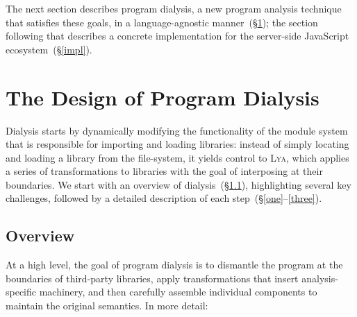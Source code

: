\documentclass[letterpaper,twocolumn,10pt]{article}
\newcommand{\sx}[1]{(\S\ref{#1})}
\newcommand{\sys}{{\scshape Lya}\xspace}
\begin{document}
The next section describes program dialysis, a new program analysis technique that satisfies these goals, in a language-agnostic manner~\sx{design};
  the section following that describes a concrete implementation for the server-side JavaScript ecosystem~\sx{impl}.

\section{The Design of Program Dialysis}
\label{design}

Dialysis starts by dynamically modifying the functionality of the module system that is responsible for importing and loading libraries:
  instead of simply locating and loading a library from the file-system, it yields control to \sys, which applies a series of transformations to libraries with the goal of interposing at their boundaries.
We start with an overview of dialysis~\sx{overview}, highlighting several key challenges, followed by a detailed description of each step~(\S\ref{one}--\ref{three}).

\subsection{Overview}
\label{overview}

At a high level, the goal of program dialysis is to dismantle the program at the boundaries of third-party libraries, apply transformations that insert analysis-specific machinery, and then carefully assemble individual components to maintain the original semantics.
 In more detail:
\end{document}
